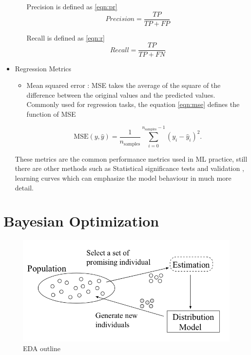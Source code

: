 \begin{itemize}
\begin{itemize}
        Precision is defined as \ref{eqn:pr}
         \begin{equation}
            Precision = \frac{TP}{TP + FP}
            \label{eqn:pr}
        \end{equation}
        
        Recall is defined as \ref{eqn:r}
         \begin{equation}
            Recall = \frac{TP}{TP + FN}
            \label{eqn:r}
        \end{equation}
        
    \end{itemize}
    
    
    \item Regression Metrics
    \begin{itemize}
        \item Mean squared error : MSE takes the average of the square of the difference between the original values and the predicted values. Commonly used for regression tasks, the equation \ref{eqn:mse} defines the function of MSE
        
        \begin{equation}
            \text{MSE}(y, \hat{y}) = \frac{1}{n_\text{samples}} \sum_{i=0}^{n_\text{samples} - 1} (y_i - \hat{y}_i)^2.
            \label{eqn:mse}
        \end{equation}
    \end{itemize}
    
    These metrics are the common performance metrics used in ML practice, still there are other methods such as Statistical significance tests and validation , learning curves which can emphasize the model behaviour in much more detail.
    
\end{itemize}



\section{Bayesian Optimization}

\begin{figure}[!h]
        	\centering
        	\includegraphics[width=0.6\linewidth]{thesis_template/images/bayesian.png}
        	\caption{EDA outline}
        	\label{fig:bayesian}
            \end{figure}


